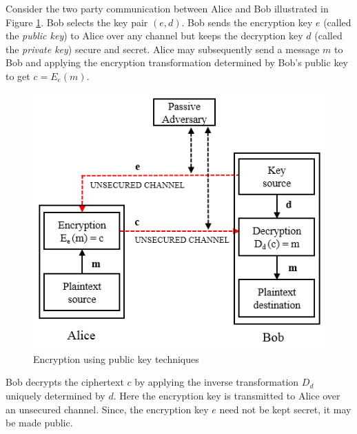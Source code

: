 	Consider the two party communication between Alice and Bob illustrated in Figure \ref{fig:public-key}. 
	Bob selects the key pair $(e, d)$. 
	Bob sends the encryption key $e$ (called the \textit{public key}) to Alice over any channel but keeps the decryption key $d$ (called the \textit{private key}) secure and secret.
	Alice may subsequently send a message $m$ to Bob and applying the encryption transformation determined by Bob's public key to get $c = E_{e}(m)$.
	\begin{figure}[h]
		\centering
		\includegraphics{images/public-key.png}
		\caption{Encryption using public key techniques}
		\label{fig:public-key}
	\end{figure}
	Bob decrypts the ciphertext $c$ by applying the inverse transformation $D_{d}$ uniquely determined by $d$.
	Here the encryption key is transmitted to Alice over an unsecured channel.
	Since, the encryption key $e$ need not be kept secret, it may be made public.

